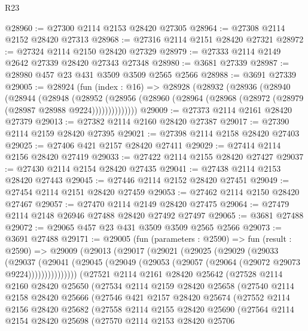 \begin{lexlean}{R23}
\begin{coremodule}
@28960 := @27300 @2114 @2153 @28420 @27305
@28964 := @27308 @2114 @2152 @28420 @27313
@28968 := @27316 @2114 @2151 @28420 @27321
@28972 := @27324 @2114 @2150 @28420 @27329
@28979 := @27333 @2114 @2149 @2642 @27339 @28420 @27343 @27348
@28980 := @3681 @27339
@28987 := @28980 @457 @23 @431 @3509 @3509 @2565 @2566
@28988 := @3691 @27339
@29005 := @28924
    (fun (index : @16) =>
    @28928
      (@28932
        (@28936
          (@28940
            (@28944
              (@28948
                (@28952
                  (@28956 (@28960 (@28964 (@28968 (@28972 (@28979 (@28987 @28988 @9224))))))))))))))
@29009 := @27373 @2114 @2161 @28420 @27379
@29013 := @27382 @2114 @2160 @28420 @27387
@29017 := @27390 @2114 @2159 @28420 @27395
@29021 := @27398 @2114 @2158 @28420 @27403
@29025 := @27406 @421 @2157 @28420 @27411
@29029 := @27414 @2114 @2156 @28420 @27419
@29033 := @27422 @2114 @2155 @28420 @27427
@29037 := @27430 @2114 @2154 @28420 @27435
@29041 := @27438 @2114 @2153 @28420 @27443
@29045 := @27446 @2114 @2152 @28420 @27451
@29049 := @27454 @2114 @2151 @28420 @27459
@29053 := @27462 @2114 @2150 @28420 @27467
@29057 := @27470 @2114 @2149 @28420 @27475
@29064 := @27479 @2114 @2148 @26946 @27488 @28420 @27492 @27497
@29065 := @3681 @27488
@29072 := @29065 @457 @23 @431 @3509 @3509 @2565 @2566
@29073 := @3691 @27488
@29171 := @29005
    (fun (parameters : @2590) =>
    fun (result : @2590) =>
    @29009
      (@29013
        (@29017
          (@29021
            (@29025
              (@29029
                (@29033
                  (@29037
                    (@29041
                      (@29045 (@29049 (@29053 (@29057 (@29064 (@29072 @29073 @9224)))))))))))))))
    (@27521
      @2114
      @2161
      @28420
      @25642
      (@27528
        @2114
        @2160
        @28420
        @25650
        (@27534
          @2114
          @2159
          @28420
          @25658
          (@27540
            @2114
            @2158
            @28420
            @25666
            (@27546
              @421
              @2157
              @28420
              @25674
              (@27552
                @2114
                @2156
                @28420
                @25682
                (@27558
                  @2114
                  @2155
                  @28420
                  @25690
                  (@27564
                    @2114
                    @2154
                    @28420
                    @25698
                    (@27570
                      @2114
                      @2153
                      @28420
                      @25706

\end{coremodule}
\end{lexlean}

